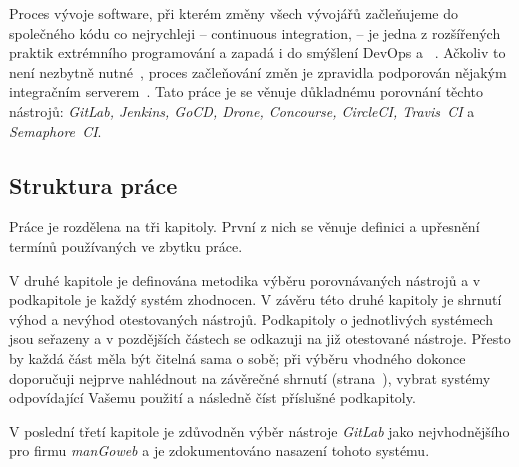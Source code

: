 \label{Úvod}
Proces vývoje software, při kterém změny všech vývojářů začleňujeme do společného kódu co nejrychleji -- continuous integration,  -- je jedna z rozšířených praktik extrémního programování a zapadá i do smýšlení DevOps a ~\cite{beyer2016site}. Ačkoliv to není nezbytně nutné~\cite{shore-ci}, proces začleňování změn je zpravidla podporován nějakým integračním serverem~\cite{fowler-ci}. Tato práce je se věnuje důkladnému porovnání těchto \CICD nástrojů: \textit{GitLab, Jenkins, GoCD, Drone, Concourse, CircleCI, Travis~CI} a \textit{Semaphore~CI}.

\subsection{Struktura práce}
    Práce je rozdělena na tři kapitoly. První z nich se věnuje definici a upřesnění termínů používaných ve zbytku práce.

    V druhé kapitole je definována metodika výběru porovnávaných \CICD nástrojů a v podkapitole je každý systém zhodnocen. V závěru této druhé kapitoly je shrnutí výhod a nevýhod otestovaných nástrojů. Podkapitoly o jednotlivých systémech jsou seřazeny a v pozdějších částech se odkazuji na již otestované nástroje. Přesto by každá část měla být čitelná sama o sobě; při výběru vhodného \CICD dokonce doporučuji nejprve nahlédnout na závěrečné shrnutí (strana~\pageref{overview}), vybrat systémy odpovídající Vašemu použití a následně číst příslušné podkapitoly.

    V poslední třetí kapitole je zdůvodněn výběr nástroje \textit{GitLab} jako nejvhodnějšího pro firmu \textit{manGoweb} a je zdokumentováno nasazení tohoto systému.
